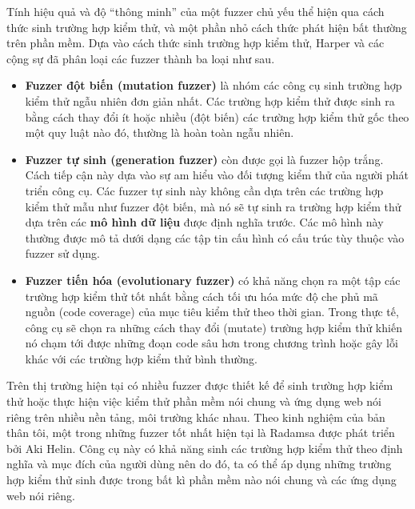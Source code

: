 Tính hiệu quả và độ ``thông minh'' của một fuzzer chủ yếu thể hiện qua cách thức sinh trường hợp kiểm thử, và một phần nhỏ cách thức phát hiện bất thường trên phần mềm. Dựa vào cách thức sinh trường hợp kiểm thử, Harper và các cộng sự \parencite{harper2011gray} đã phân loại các fuzzer thành ba loại như sau.
\begin{itemize}
    \item \textbf{Fuzzer đột biến (mutation fuzzer)} là nhóm các công cụ sinh trường hợp kiểm thử ngẫu nhiên đơn giản nhất. Các trường hợp kiểm thử được sinh ra bằng cách thay đổi ít hoặc nhiều (đột biến) các trường hợp kiểm thử gốc theo một quy luật nào đó, thường là hoàn toàn ngẫu nhiên.
    \item \textbf{Fuzzer tự sinh (generation fuzzer)} còn được gọi là fuzzer hộp trắng. Cách tiếp cận này dựa vào sự am hiểu vào đối tượng kiểm thử của người phát triển công cụ. Các fuzzer tự sinh này không cần dựa trên các trường hợp kiểm thử mẫu như fuzzer đột biến, mà nó sẽ tự sinh ra trường hợp kiểm thử dựa trên các \textbf{mô hình dữ liệu} được định nghĩa trước. Các mô hình này thường được mô tả dưới dạng các tập tin cấu hình có cấu trúc tùy thuộc vào fuzzer sử dụng.
    \item \textbf{Fuzzer tiến hóa (evolutionary fuzzer)} có khả năng chọn ra một tập các trường hợp kiểm thử tốt nhất bằng cách tối ưu hóa mức độ che phủ mã nguồn (code coverage) của mục tiêu kiểm thử theo thời gian. Trong thực tế, công cụ sẽ chọn ra những cách thay đổi (mutate) trường hợp kiểm thử khiến nó chạm tới được những đoạn code sâu hơn trong chương trình hoặc gây lỗi khác với các trường hợp kiểm thử bình thường.
\end{itemize}
Trên thị trường hiện tại có nhiều fuzzer được thiết kế để sinh trường hợp kiểm thử hoặc thực hiện việc kiểm thử phần mềm nói chung và ứng dụng web nói riêng trên nhiều nền tảng, môi trường khác nhau. Theo kinh nghiệm của bản thân tôi, một trong những fuzzer tốt nhất hiện tại là Radamsa \parencite{radamsa-gitlab} được phát triển bởi Aki Helin. Công cụ này có khả năng sinh các trường hợp kiểm thử theo định nghĩa và mục đích của người dùng nên do đó, ta có thể áp dụng những trường hợp kiểm thử sinh được trong bất kì phần mềm nào nói chung và các ứng dụng web nói riêng.
